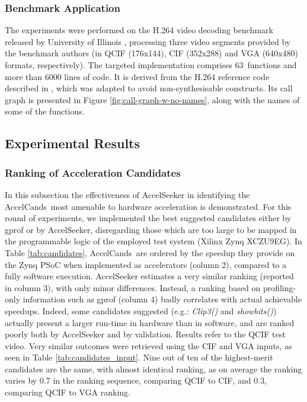 \documentclass[]{usiinfthesis}
\newcommand{\aseeker}{{AccelSeeker}}
\newcommand{\candidates}{{AccelCand}s}
\newcommand{\numberOfcandidates}{{63}}
\begin{document}
%
%
%
\subsubsection{Benchmark Application}

The experiments were performed on the H.264 video decoding benchmark released by 
University of Illinois \cite{LiuFeb16}, processing three video
segments provided by the benchmark authors (in QCIF (176x144), CIF (352x288) and
VGA (640x480) formats, respectively). The targeted implementation comprises \numberOfcandidates\ 
functions and more than 6000 lines of code. It is derived from the H.264
reference code described in \cite{H264May15}, which was adapted to
avoid non-synthesisable constructs. Its call graph is presented in Figure
\ref{fig:call-graph-w-no-names}, along with the names of some of the
functions. 


\subsection{Experimental Results}
\label{sec:results_as}

%
%
%
\subsubsection{Ranking of Acceleration Candidates} 

In this subsection the effectiveness of \aseeker{} in identifying
the \candidates\ most amenable to hardware acceleration is demonstrated. 
For this round of experiments, we implemented the best suggested candidates
either by gprof or by \aseeker{}, disregarding those which are too
large to be mapped in the programmable logic of the employed test
system (Xilinx Zynq XCZU9EG).  In Table \ref{tab:candidates},
\candidates\ are ordered by the speedup they provide on the Zynq PSoC 
when implemented as accelerators  (column 2), compared to a
fully software execution.  \aseeker{} estimates a very similar ranking
(reported in column 3), with only minor differences. Instead, a
ranking based on profiling-only information such as gprof (column 4)
badly correlates with actual achievable speedups.
Indeed, some candidates suggested (e.g.: \emph{Clip3()} and
\emph{showbits()}) actually present a larger run-time in hardware than
in software, and are ranked poorly both by \aseeker{} and by
validation.
Results refer to the QCIF test video. Very similar outcomes were retrieved 
using the CIF and VGA inputs, as seen in Table \ref{tab:candidates_input}. 
Nine out of ten of the highest-merit candidates are the same, with almost identical ranking,
as on average the ranking varies by 0.7 in the ranking sequence, comparing QCIF 
to CIF, and 0.3, comparing QCIF to VGA ranking.
\end{document}
